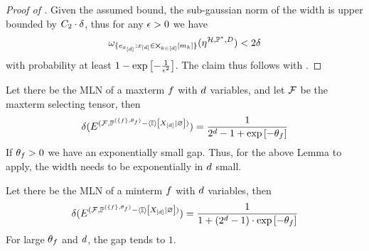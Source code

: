 \begin{proof}[Proof of ]
	Given the assumed bound, the sub-gaussian norm of the width is upper bounded by $C_2\cdot \delta$, thus for any $\epsilon>0$ we have
		\[  \omega_{\{e_{x_{[d]}} :x_{[d]}\in\bigtimes_{k\in[d]}[m_{k}]\}}(\eta^{\mathcal{H},\mathbb{P}^*,D})  < 2 \delta \]
	with probability at least $1-\mathrm{exp}\left[-\frac{1}{\epsilon^2}\right]$.
	The claim thus follows with .
\end{proof}




\begin{example}
	Let there be the MLN of a maxterm $f$ with $d$ variables, and let $\mathcal{F}$ be the maxterm selecting tensor, then 
		\[ \delta(
		E^{(\mathcal{F}, \mathbb{P}^{(\{f\},\theta_{f})} - \left\langle \mathbb{I}\right\rangle \left[ X_{[d]} | \varnothing \right] )}
		) = \frac{1}{2^{d}-1 + \mathrm{exp}\left[-\theta_{f}\right]}  \]
	If $\theta_{f}>0$ we have an exponentially small gap.
	Thus, for the above Lemma to apply, the width needs to be exponentially in $d$ small.
	
	
	Let there be the MLN of a minterm $f$ with $d$ variables, then 
		\[ \delta(
		E^{(\mathcal{F}, \mathbb{P}^{(\{f\},\theta_{f})} - \left\langle \mathbb{I}\right\rangle \left[ X_{[d]} | \varnothing \right] )}
		) = \frac{1}{1+(2^{d}-1)\cdot\mathrm{exp}\left[-\theta_{f}\right]}  \]
	For large $\theta_{f}$ and $d$, the gap tends to $1$.
\end{example}












